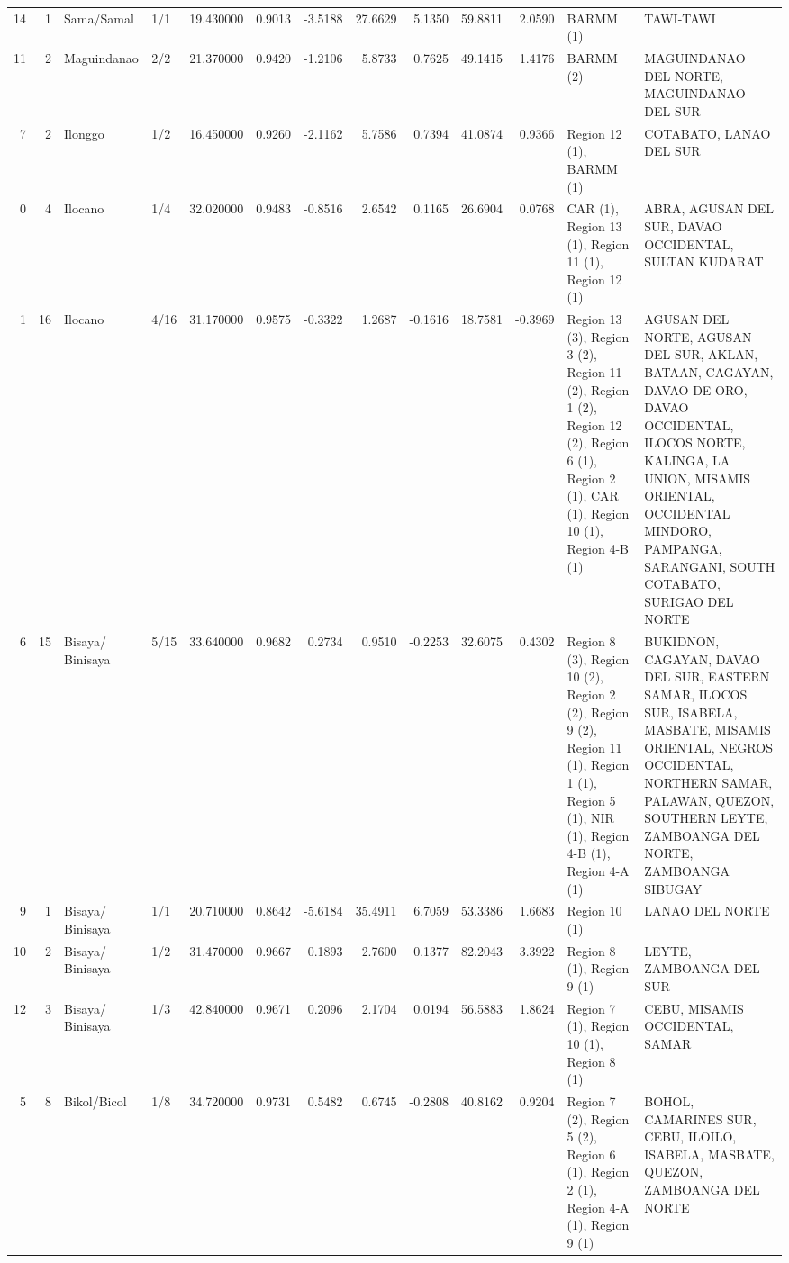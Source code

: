 \begin{tabular}{rrllrrrrrrrll}
14 & 1 & Sama/Samal & 1/1 & {\cellcolor[HTML]{6A8BEF}} \color[HTML]{F1F1F1} 19.430000 & 0.9013 & -3.5188 & 27.6629 & 5.1350 & 59.8811 & 2.0590 & BARMM (1) & TAWI-TAWI \\
11 & 2 & Maguindanao & 2/2 & {\cellcolor[HTML]{82A6FB}} \color[HTML]{F1F1F1} 21.370000 & 0.9420 & -1.2106 & 5.8733 & 0.7625 & 49.1415 & 1.4176 & BARMM (2) & MAGUINDANAO DEL NORTE, MAGUINDANAO DEL SUR \\
7 & 2 & Ilonggo & 1/2 & {\cellcolor[HTML]{465ECF}} \color[HTML]{F1F1F1} 16.450000 & 0.9260 & -2.1162 & 5.7586 & 0.7394 & 41.0874 & 0.9366 & Region 12 (1), BARMM (1) & COTABATO, LANAO DEL SUR \\
0 & 4 & Ilocano & 1/4 & {\cellcolor[HTML]{F2C9B4}} \color[HTML]{000000} 32.020000 & 0.9483 & -0.8516 & 2.6542 & 0.1165 & 26.6904 & 0.0768 & CAR (1), Region 13 (1), Region 11 (1), Region 12 (1) & ABRA, AGUSAN DEL SUR, DAVAO OCCIDENTAL, SULTAN KUDARAT \\
1 & 16 & Ilocano & 4/16 & {\cellcolor[HTML]{EED0C0}} \color[HTML]{000000} 31.170000 & 0.9575 & -0.3322 & 1.2687 & -0.1616 & 18.7581 & -0.3969 & Region 13 (3), Region 3 (2), Region 11 (2), Region 1 (2), Region 12 (2), Region 6 (1), Region 2 (1), CAR (1), Region 10 (1), Region 4-B (1) & AGUSAN DEL NORTE, AGUSAN DEL SUR, AKLAN, BATAAN, CAGAYAN, DAVAO DE ORO, DAVAO OCCIDENTAL, ILOCOS NORTE, KALINGA, LA UNION, MISAMIS ORIENTAL, OCCIDENTAL MINDORO, PAMPANGA, SARANGANI, SOUTH COTABATO, SURIGAO DEL NORTE \\
6 & 15 & Bisaya/ Binisaya & 5/15 & {\cellcolor[HTML]{F7B89C}} \color[HTML]{000000} 33.640000 & 0.9682 & 0.2734 & 0.9510 & -0.2253 & 32.6075 & 0.4302 & Region 8 (3), Region 10 (2), Region 2 (2), Region 9 (2), Region 11 (1), Region 1 (1), Region 5 (1), NIR (1), Region 4-B (1), Region 4-A (1) & BUKIDNON, CAGAYAN, DAVAO DEL SUR, EASTERN SAMAR, ILOCOS SUR, ISABELA, MASBATE, MISAMIS ORIENTAL, NEGROS OCCIDENTAL, NORTHERN SAMAR, PALAWAN, QUEZON, SOUTHERN LEYTE, ZAMBOANGA DEL NORTE, ZAMBOANGA SIBUGAY \\
9 & 1 & Bisaya/ Binisaya & 1/1 & {\cellcolor[HTML]{7A9DF8}} \color[HTML]{F1F1F1} 20.710000 & 0.8642 & -5.6184 & 35.4911 & 6.7059 & 53.3386 & 1.6683 & Region 10 (1) & LANAO DEL NORTE \\
10 & 2 & Bisaya/ Binisaya & 1/2 & {\cellcolor[HTML]{F0CDBB}} \color[HTML]{000000} 31.470000 & 0.9667 & 0.1893 & 2.7600 & 0.1377 & 82.2043 & 3.3922 & Region 8 (1), Region 9 (1) & LEYTE, ZAMBOANGA DEL SUR \\
12 & 3 & Bisaya/ Binisaya & 1/3 & {\cellcolor[HTML]{B40426}} \color[HTML]{F1F1F1} 42.840000 & 0.9671 & 0.2096 & 2.1704 & 0.0194 & 56.5883 & 1.8624 & Region 7 (1), Region 10 (1), Region 8 (1) & CEBU, MISAMIS OCCIDENTAL, SAMAR \\
5 & 8 & Bikol/Bicol & 1/8 & {\cellcolor[HTML]{F7AA8C}} \color[HTML]{000000} 34.720000 & 0.9731 & 0.5482 & 0.6745 & -0.2808 & 40.8162 & 0.9204 & Region 7 (2), Region 5 (2), Region 6 (1), Region 2 (1), Region 4-A (1), Region 9 (1) & BOHOL, CAMARINES SUR, CEBU, ILOILO, ISABELA, MASBATE, QUEZON, ZAMBOANGA DEL NORTE \\
\bottomrule
\end{tabular}
